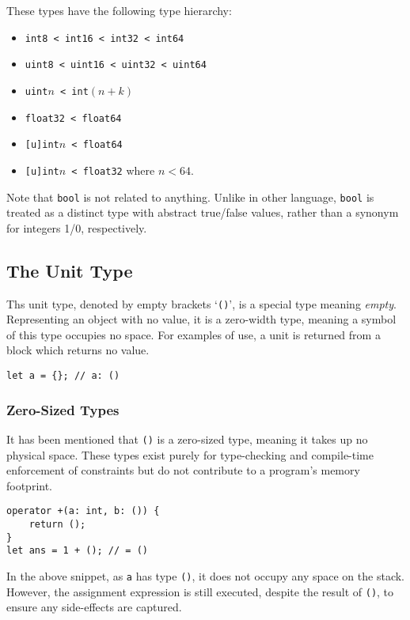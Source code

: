 These types have the following type hierarchy:
\begin{itemize}
    \item \texttt{int8 < int16 < int32 < int64}
    \item \texttt{uint8 < uint16 < uint32 < uint64}
    \item \texttt{uint\(n\) < int\((n+k)\)}
    \item \texttt{float32 < float64}
    \item \texttt{[u]int\(n\) < float64}
    \item \texttt{[u]int\(n\) < float32} where \(n < 64\).
\end{itemize}

Note that \texttt{bool} is not related to anything.
Unlike in other language, \texttt{bool} is treated as a distinct type with abstract true/false values, rather than a synonym for integers 1/0, respectively.

\subsection{The Unit Type}

Ths unit type, denoted by empty brackets `\texttt{()}', is a special type meaning \textit{empty}.
Representing an object with no value, it is a zero-width type, meaning a symbol of this type occupies no space.
For examples of use, a unit is returned from a block which returns no value.

\begin{lstlisting}[language=CustomLang]
let a = {}; // a: ()
\end{lstlisting}

\subsubsection{Zero-Sized Types}

It has been mentioned that \texttt{()} is a zero-sized type, meaning it takes up no physical space.
These types exist purely for type-checking and compile-time enforcement of constraints but do not contribute to a program's memory footprint.

\begin{lstlisting}[language=CustomLang]
operator +(a: int, b: ()) {
    return ();
}
let ans = 1 + (); // = ()
\end{lstlisting}

In the above snippet, as \texttt{a} has type \texttt{()}, it does not occupy any space on the stack.
However, the assignment expression is still executed, despite the result of \texttt{()}, to ensure any side-effects are captured.

